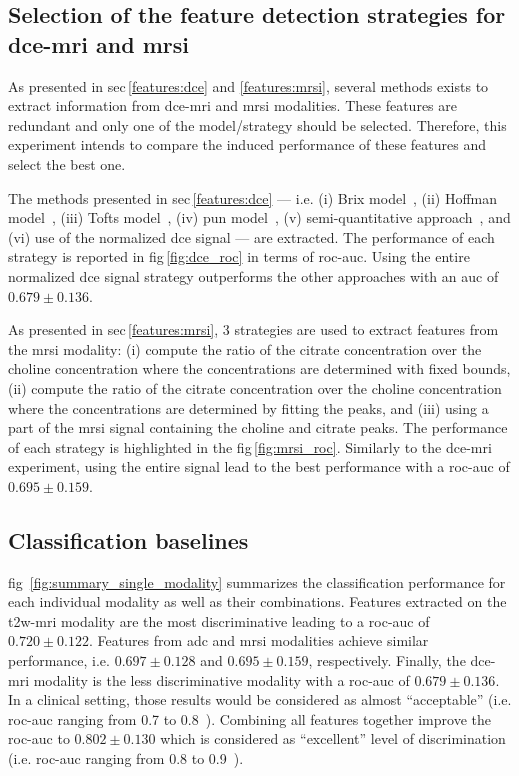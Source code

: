 \documentclass[final,3p,times,twocolumn]{elsarticle}
\begin{document}
\subsection{Selection of the feature detection strategies for
  \ac{dce}-\ac{mri} and \ac{mrsi}}\label{exp:dce_mrsi_sel}

As presented in \acs{sec}\,\ref{features:dce} and \ref{features:mrsi}, several
methods exists to extract information from \ac{dce}-\ac{mri} and \ac{mrsi}
modalities. These features are redundant and only one of the model/strategy
should be selected. Therefore, this experiment intends to compare the
induced performance of these features and select the best one.

The methods presented in \acs{sec}\,\ref{features:dce} --- i.e. (i) Brix
model~\cite{brix1991pharmacokinetic}, (ii) Hoffman
model~\cite{hoffmann1995pharmacokinetic}, (iii) Tofts
model~\cite{tofts1995quantitative}, (iv) \ac{pun}
model~\cite{gliozzi2011phenomenological}, (v) semi-quantitative
approach~\cite{huisman2001accurate}, and (vi) use of the normalized \ac{dce}
signal --- are extracted. The performance of each strategy is reported in
\acs{fig}\,\ref{fig:dce_roc} in terms of \ac{roc}-\ac{auc}. Using the entire
normalized \ac{dce} signal strategy outperforms the other approaches with an
\ac{auc} of $0.679 \pm 0.136$.

As presented in \acs{sec}\,\ref{features:mrsi}, 3 strategies are used to
extract features from the \ac{mrsi} modality: (i) compute the ratio of the
citrate concentration over the choline concentration where the concentrations
are determined with fixed \si{\ppm} bounds, (ii) compute the ratio of the
citrate concentration over the choline concentration where the concentrations
are determined by fitting the peaks, and (iii) using a part of the \ac{mrsi}
signal containing the choline and citrate peaks. The performance of each
strategy is highlighted in the \acs{fig}\,\ref{fig:mrsi_roc}. Similarly to the
\ac{dce}-\ac{mri} experiment, using the entire signal lead to the best
performance with a \ac{roc}-\ac{auc} of $0.695 \pm 0.159$.

\subsection{Classification baselines}

\Acl{fig}~\ref{fig:summary_single_modality} summarizes the classification
performance for each individual modality as well as their
combinations. Features extracted on the \ac{t2w}-\ac{mri} modality are the most
discriminative leading to a \ac{roc}-\ac{auc} of $0.720 \pm 0.122$. Features
from \ac{adc} and \ac{mrsi} modalities achieve similar performance,
i.e. $0.697 \pm 0.128$ and $0.695 \pm 0.159$, respectively. Finally, the
\ac{dce}-\ac{mri} modality is the less discriminative modality with a
\ac{roc}-\ac{auc} of $0.679 \pm 0.136$. In a clinical setting, those results
would be considered as almost ``acceptable'' (i.e. \ac{roc}-\ac{auc} ranging
from 0.7 to 0.8~\cite{hosmer2004applied}). Combining all features together
improve the \ac{roc}-\ac{auc} to $0.802 \pm 0.130$ which is considered as
``excellent'' level of discrimination (i.e. \ac{roc}-\ac{auc} ranging
from 0.8 to 0.9~\cite{hosmer2004applied}).
\end{document}

